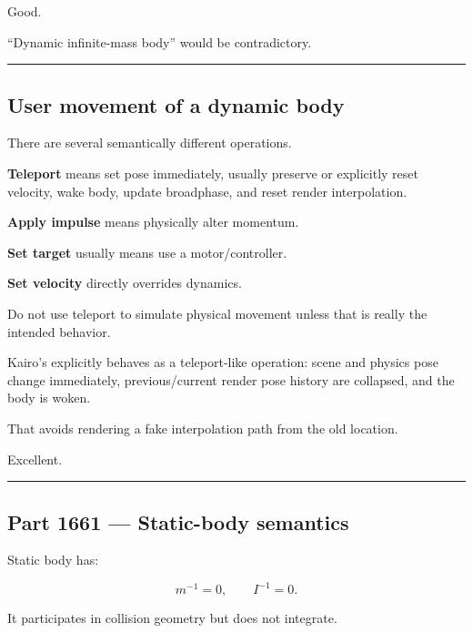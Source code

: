 Good.

``Dynamic infinite-mass body'' would be contradictory.

\begin{center}\rule{0.5\linewidth}{0.5pt}\end{center}

\subsection{User movement of a dynamic body}\label{06-engine-ii-ch037-user-movement-of-a-dynamic-body}

\hypertarget{06-engine-ii-ch037-user-movement-of-a-dynamic-body}{}

There are several semantically different operations.

\textbf{Teleport} means set pose immediately, usually preserve or explicitly reset velocity, wake body, update broadphase, and reset render interpolation.

\textbf{Apply impulse} means physically alter momentum.

\textbf{Set target} usually means use a motor/controller.

\textbf{Set velocity} directly overrides dynamics.

Do not use teleport to simulate physical movement unless that is really the intended behavior.

Kairo's  explicitly behaves as a teleport-like operation: scene and physics pose change immediately, previous/current render pose history are collapsed, and the body is woken.

That avoids rendering a fake interpolation path from the old location.

Excellent.

\begin{center}\rule{0.5\linewidth}{0.5pt}\end{center}

\subsection{Part 1661 --- Static-body semantics}\label{06-engine-ii-ch037-part-1661-static-body-semantics}

\hypertarget{06-engine-ii-ch037-part-1661-static-body-semantics}{}

Static body has:

\[
m^{-1}=0,
\qquad
I^{-1}=0.
\]

It participates in collision geometry but does not integrate.

